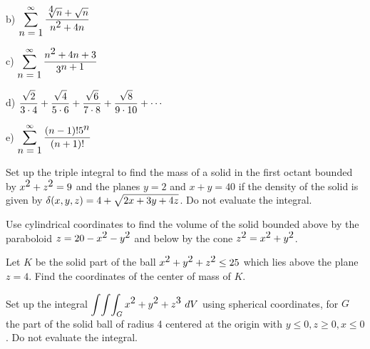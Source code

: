 \vspace{1.3in}

\noindent b) $\displaystyle \sum_{\displaystyle n=1}^{\infty} \frac{\sqrt[\displaystyle 4]{n}+\sqrt{n}}{n^{\displaystyle 2}+4n} $ 

\vspace{1.3in}

\noindent c) $\displaystyle \sum_{\displaystyle n=1}^{\infty} \frac{n^{\displaystyle 2}+4n+3}{3^{\displaystyle n+1}} $ 

\vspace{1.3in}

\noindent d) $\displaystyle \frac{\displaystyle \sqrt{2}}{\displaystyle 3 \cdot 4} +
 \frac{\displaystyle \sqrt{4}}{\displaystyle 5 \cdot 6}+
\frac{\displaystyle \sqrt{6}}{\displaystyle 7 \cdot 8} +
\frac{\displaystyle \sqrt{8}}{\displaystyle 9 \cdot 10} + \cdots
 $ 
\vspace{1.3in}

\noindent e) $\displaystyle \sum_{\displaystyle n=1}^{\infty} 
\frac{(n-1)! 5^{\displaystyle n}}{(n+1)!} $

\vspace{3.5in}

\quest Set up the triple integral to find the mass of a solid
in the first octant bounded by $x^{\displaystyle 2} + z^{\displaystyle 2} = 9$ and
the planes $y=2$ and $x+y=40$ if the density of the solid is
given by $\delta(x,y,z)=4+\displaystyle \sqrt{2x+3y+4z}$. Do not
evaluate the integral.
\quend \vspace{3in}


\quest Use cylindrical coordinates to find the
volume of the solid bounded above by the paraboloid
$z= 20 -x^{\displaystyle 2} - y^{\displaystyle 2} $ and below
by the cone $z^{\displaystyle 2}=x^{\displaystyle 2} + y^{\displaystyle 2}$.
\quend

\newpage
\quest Let $K$ be the solid part of the ball 
 $ x^{\displaystyle 2} + y^{\displaystyle 2} +z^{\displaystyle 2} \leq 25$ which lies above
the plane $z=4$.  Find the coordinates of the center of
mass of $K$.
\quend \vspace{4in}


%
%
%
%
%
\quest
Set up the integral
$\displaystyle \int\!\int\!\int_{G}
x^{\displaystyle 2}+y^{\displaystyle 2}+z^{\displaystyle 3}  \ dV $ using spherical coordinates,
for $G$ the part of the solid ball of radius 4 centered at
the origin with $y \leq 0, z \geq 0, x \leq 0 $.  Do not  evaluate the integral.
\quend

